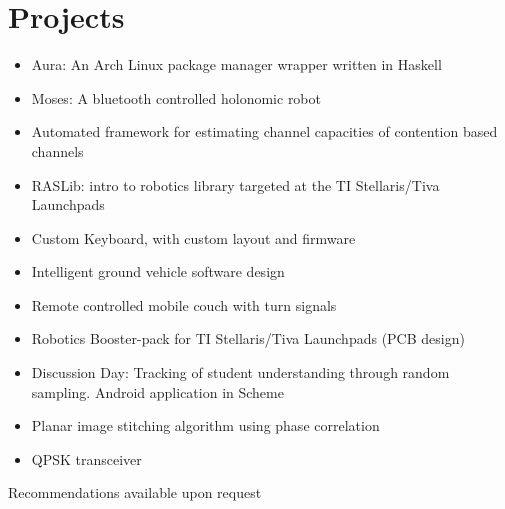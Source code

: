 \documentclass[letterpaper,12pt]{resume}
\begin{document}
\section{Projects}
\begin{itemize} 
  \item
    Aura: An Arch Linux package manager wrapper written in Haskell
  \item
    Moses: A bluetooth controlled holonomic robot
  \item
    Automated framework for estimating channel capacities of contention based channels
  \item
    RASLib: intro to robotics library targeted at the TI Stellaris/Tiva Launchpads
  \item
    Custom Keyboard, with custom layout and firmware
  \item
    Intelligent ground vehicle software design
  \item
    Remote controlled mobile couch with turn signals
  \item
    Robotics Booster-pack for TI Stellaris/Tiva Launchpads (PCB design)
  \item 
    Discussion Day: Tracking of student understanding through random sampling. Android application in Scheme
  \item
    Planar image stitching algorithm using phase correlation
  \item
    QPSK transceiver
\end{itemize}

\par
\begin{center}
  Recommendations available upon request
\end{center}
\end{document}
